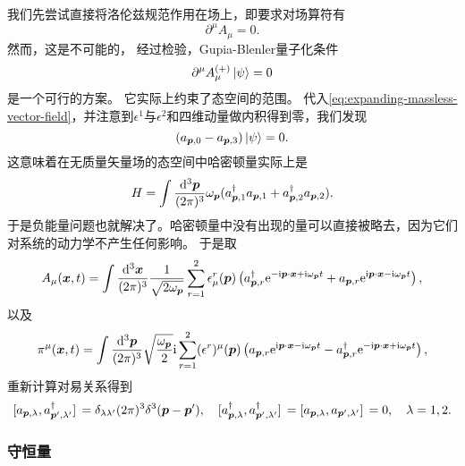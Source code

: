 \documentclass[hyperref, UTF8, a4paper]{ctexart}
\newcommand*{\ii}{\mathrm{i}}
\newcommand*{\ee}{\mathrm{e}}
\begin{document}
我们先尝试直接将洛伦兹规范作用在场上，即要求对场算符有
\[
    \partial^\mu A_\mu = 0.
\]
然而，这是不可能的，
经过检验，Gupia-Blenler量子化条件
\begin{equation}
    \partial^\mu {A}_\mu^{(+)} \ket{\psi} = 0
    \label{eq:gupia-blenlder}
\end{equation}
是一个可行的方案。
它实际上约束了态空间的范围。
代入\eqref{eq:expanding-massless-vector-field}，并注意到$\epsilon^1$与$\epsilon^2$和四维动量做内积得到零，我们发现
\begin{equation}
    ({a}_{\vb*{p}, 0} - {a}_{\vb*{p}, 3}) \ket{\psi} = 0.
\end{equation}
这意味着在无质量矢量场的态空间中哈密顿量实际上是
\begin{equation}
    {H} = \int \frac{\dd[3]{\vb*{p}}}{(2\pi)^3} \omega_{\vb*{p}} ({a}_{\vb*{p},1}^\dagger {a}_{\vb*{p}, 1} + {a}_{\vb*{p},2}^\dagger {a}_{\vb*{p}, 2}).
\end{equation}
于是负能量问题也就解决了。哈密顿量中没有出现的量可以直接被略去，因为它们对系统的动力学不产生任何影响。
于是取
\begin{equation}
    A_\mu (\vb*{x}, t) = \int \frac{\dd[3]{\vb*{x}}}{(2\pi)^3} \frac{1}{\sqrt{2 \omega_{\vb*{p}}}} \sum_{r=1}^2 \epsilon_\mu^r(\vb*{p}) \left({a}_{\vb*{p}, r}^\dagger \ee^{ - \ii \vb*{p} \cdot \vb*{x} + \ii \omega_{\vb*{p}} t} + {a}_{\vb*{p}, r} \ee^{ \ii \vb*{p} \cdot \vb*{x} - \ii \omega_{\vb*{p}} t} \right),
\end{equation}
以及
\begin{equation}
    \pi^\mu (\vb*{x}, t) = \int \frac{\dd[3]{\vb*{p}}}{(2\pi)^3} \sqrt{\frac{\omega_{\vb*{p}}}{2}} \ii \sum_{r=1}^2 (\epsilon^r)^\mu (\vb*{p}) \left( {a}_{\vb*{p}, r} \ee^{\ii \vb*{p} \cdot \vb*{x} - \ii \omega_{\vb*{p}} t} - {a}_{\vb*{p}, r}^\dagger \ee^{ - \ii \vb*{p} \cdot \vb*{x} + \ii \omega_{\vb*{p}} t} \right),
\end{equation}
重新计算对易关系得到
\begin{equation}
    \comm*{{a}_{\vb*{p}, \lambda}}{{a}^\dagger_{\vb*{p}', \lambda'}} = \delta_{\lambda \lambda'} (2\pi)^3 \delta^3(\vb*{p} - \vb*{p}'), \quad \comm*{{a}^\dagger_{\vb*{p}, \lambda}}{{a}^\dagger_{\vb*{p}', \lambda'}} = \comm*{{a}_{\vb*{p}, \lambda}}{{a}_{\vb*{p}', \lambda'}} = 0, \quad \lambda = 1, 2.
\end{equation}

\subsubsection{守恒量}
\end{document}
